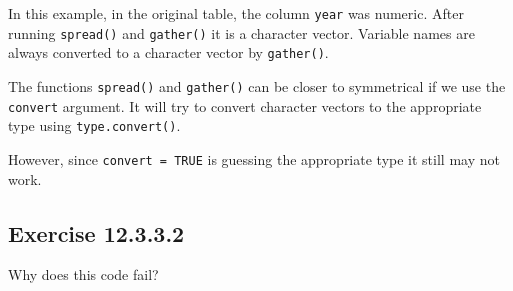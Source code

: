 \documentclass[]{book}
\newenvironment{Shaded}{\begin{snugshade}}{\end{snugshade}}
\newcommand{\CommentTok}[1]{\textcolor[rgb]{0.56,0.35,0.01}{\textit{#1}}}
\newcommand{\DataTypeTok}[1]{\textcolor[rgb]{0.13,0.29,0.53}{#1}}
\newcommand{\DecValTok}[1]{\textcolor[rgb]{0.00,0.00,0.81}{#1}}
\newcommand{\KeywordTok}[1]{\textcolor[rgb]{0.13,0.29,0.53}{\textbf{#1}}}
\newcommand{\NormalTok}[1]{#1}
\newcommand{\OperatorTok}[1]{\textcolor[rgb]{0.81,0.36,0.00}{\textbf{#1}}}
\newcommand{\OtherTok}[1]{\textcolor[rgb]{0.56,0.35,0.01}{#1}}
\newcommand{\StringTok}[1]{\textcolor[rgb]{0.31,0.60,0.02}{#1}}
\theoremstyle{plain}
\theoremstyle{remark}
\begin{document}
In this example, in the original table, the column \texttt{year} was numeric.
After running \texttt{spread()} and \texttt{gather()} it is a character vector.
Variable names are always converted to a character vector by \texttt{gather()}.

The functions \texttt{spread()} and \texttt{gather()} can be closer to symmetrical if we use the \texttt{convert} argument. It will try to convert character vectors to the appropriate type using \texttt{type.convert()}.

\begin{Shaded}
\end{Shaded}

However, since \texttt{convert\ =\ TRUE} is guessing the appropriate type it still may not work.

\hypertarget{exercise-12.3.3.2}{%
\subsection*{\texorpdfstring{Exercise {12.3.3.2}}{Exercise 12.3.3.2}}\label{exercise-12.3.3.2}}

Why does this code fail?

\begin{Shaded}
\end{Shaded}
\end{document}
